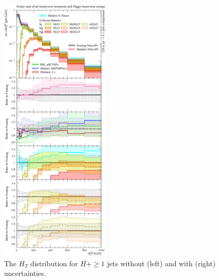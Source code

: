 {\begin{figure}[t!]
  \includegraphics[width=0.47\textwidth]{figures/hjetscomp_HT_all.pdf}
  \caption{
    The $H_T$ distribution for $H+\ge1$ jets 
    without (left) and with (right) uncertainties.
    \label{fig:hjetscomp:results:mobs:HT_all}
  }
\end{figure}

}
